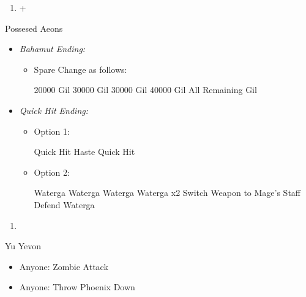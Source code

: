 \begin{enumerate}[resume]
	\item \cs+\skippablefmv[4:00]
\end{enumerate}
\begin{battle}{Possesed Aeons}
\begin{itemize}
	\item \textit{Bahamut Ending:}
	\begin{itemize}
		\item Spare Change as follows:
		\begin{itemize}
			\valeforf \num{20000} Gil
			\ifritf \num{30000} Gil
			\ixilonf \num{30000} Gil
			\bahamutf \num{40000} Gil
			\shivaf All Remaining Gil
		\end{itemize}
	\end{itemize}
	\item \textit{Quick Hit Ending:}
	\begin{itemize}
		\yunaf Elixer \yuna
		\item Option 1:
		\begin{itemize}
			\yunaf Quick Hit
			\yunaf Haste \yuna
			\yunaf Quick Hit
		\end{itemize}
		\item Option 2:
		\begin{itemize}
			\valeforf Waterga
			\ifritf Waterga
			\shivaf Waterga
			\bahamutf Waterga x2
			\ixilonf Switch Weapon to Mage's Staff
			\tidusf Defend
			\yunaf Waterga
		\end{itemize}
	\end{itemize}
\end{itemize}
\end{battle}
\begin{enumerate}[resume]
	\item \cs[1:40]
\end{enumerate}
\begin{battle}[99999]{Yu Yevon}
\begin{itemize}
	\item Anyone: Zombie Attack
	\item Anyone: Throw Phoenix Down
\end{itemize}
\end{battle}

	